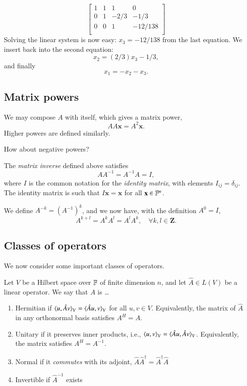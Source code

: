 \begin{myExample}{}{}
\begin{equation}
\begin{bmatrix}
    1 & 1 & 1 & 0 \\
    0 & 1 & -2/3 & -1/3 \\
    0 & 0 & 1 & -12/138 \\
\end{bmatrix}
\end{equation}
Solving the linear system is now easy: $x_3 = -12/138$ from the last equation. We insert back into the second equation:
\begin{equation}
    x_2 = (2/3)  x_3 - 1/3,
\end{equation}
and finally
\begin{equation}
    x_1 = -x_2 - x_3.
\end{equation}
\end{myExample}

\subsection{Matrix powers}


We may compose $A$  with itself, which gives a matrix power,
\[ AA\mathbf{x} = A^2 \mathbf{x}. \]
Higher powers are defined similarly.

How about negative powers? 

The \emph{matrix inverse} defined above satisfies
\[ AA^{-1} = A^{-1} A = I, \]
where $I$ is the common notation for the \emph{identity matrix}, with elements $I_{ij} = \delta_{ij}$. The identity matrix is such that $I\mathbf{x} = \mathbf{x}$ for all $\mathbf{x}\in \mathbb{F}^n$.


We define $A^{-k} = (A^{-1})^k$, and we now have, with the definition $A^0 = I$,
\[ A^{k+l} = A^k A^l = A^l A^k, \quad \forall k,l\in\mathbf{Z}. \]


\subsection{Classes of operators}

We now consider some important classes of operators.

\begin{myDefinition}{}{}
    Let $V$ be a Hilbert space over $\mathbb{F}$ of finite dimension $n$, and let $\hat{A} \in L(V)$ be a linear operator. We say that $A$ is \ldots
    \begin{enumerate}
        \item Hermitian if $\braket{u,\hat{A}v}_V = \braket{\hat{A}u,v}_V$ for all $u,v\in V$. Equivalently, the matrix of $\hat{A}$ in any orthonormal basis satisfies $A^H = A$.
        \item Unitary if it preserves inner products, i.e., $\braket{u,v}_V = \braket{\hat{A}u,\hat{A}v}_V$. Equivalently, the matrix satisfies $A^H = A^{-1}$.
        \item Normal if it \emph{commutes} with its adjoint, $\hat{A} \hat{A}^\dag = \hat{A}^\dag \hat{A}$
        \item Invertible if $\hat{A}^{-1}$ exists
    \end{enumerate}
\end{myDefinition}

